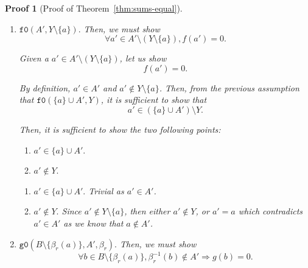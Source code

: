 \documentclass[pdflatex,sn-mathphys]{sn-jnl}%
\theoremstyle{thmstyleone}%
\theoremstyle{thmstyletwo}%
\newtheorem*{pf}{Proof}%
\theoremstyle{thmstylethree}%
\begin{document}
\begin{appendices}
\begin{pf}[Proof of Theorem~\ref{thm:sums-equal}]
\begin{enumerate}
\begin{enumerate}
\begin{enumerate}
           \item $\boxed{\mathtt{f0}(A',Y\setminus\{a\}).}$ Then, we must show
             \begin{equation*}
               \boxed{\forall{}a'\in{}A'\setminus(Y\setminus\{a\}),f(a')=0.}
             \end{equation*}

             Given a $a'\in{}A'\setminus(Y\setminus\{a\})$, let us show
             \begin{equation*}
               \boxed{f(a')=0.}
             \end{equation*}

             By definition, $a'\in{}A'$ and
             $a'\notin{}Y\setminus\{a\}$. Then, from the previous
             assumption that $\mathtt{f0}(\{a\}\cup{}A',Y)$, it is
             sufficient to show that
             \begin{equation*}
               \boxed{a'\in(\{a\}\cup{}A')\setminus{}Y.}
             \end{equation*}

             Then, it is sufficient to show the two following points:
             \begin{enumerate}
             \item $\boxed{a'\in\{a\}\cup{}A'.}$
             \item $\boxed{a'\notin{}Y.}$
             \end{enumerate}

             \vspace{10pt}

             \begin{enumerate}
             \item $\boxed{a'\in\{a\}\cup{}A'.}$ Trivial as $a'\in{}A'$.
             \item $\boxed{a'\notin{}Y.}$ Since
               $a'\notin{}Y\setminus\{a\}$, then either $a'\notin{}Y$,
               or $a'=a$ which contradicts $a'\in{}A'$ as we know that
               $a\notin{}A'$.
             \end{enumerate}
             
           \item $\boxed{\mathtt{g0}(B\setminus\{\beta_r(a)\},A',\beta_r).}$ Then, we must show
             \begin{equation*}
               \boxed{\forall{}b\in{}B\setminus\{\beta_r(a)\},\beta_r^{-1}(b)\notin{}A'\Rightarrow{}g(b)=0.}
             \end{equation*}


\end{enumerate}
\end{enumerate}
\end{enumerate}
\end{pf}
\end{appendices}
\end{document}
